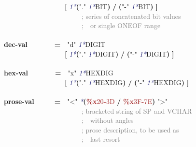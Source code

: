 \documentclass{article}
\begin{document}
{\mbox{~~~~~~~~~~~~~~~~~~}\textbf{[} \textcolor{MidnightBlue}{\emph{1*}}\textbf{(}\textcolor{BrickRed}{"."} \textcolor{MidnightBlue}{\emph{1*}}BIT\textbf{)} \textbf{/} \textbf{(}\textcolor{BrickRed}{"-{}"} \textcolor{MidnightBlue}{\emph{1*}}BIT\textbf{)} \textbf{]}\\
\mbox{~~~~~~~~~~~~~~~~~~~~~~~}\textcolor{Gray}{; series of concatenated bit values}\\
\mbox{~~~~~~~~~~~~~~~~~~~~~~~}\textcolor{Gray}{;\mbox{~~}or single ONEOF range}\\
\\
\textbf{dec-{}val}\mbox{~~~~~~~~}\textbf{=}\mbox{~~}\textcolor{BrickRed}{"d"} \textcolor{MidnightBlue}{\emph{1*}}DIGIT\\
\mbox{~~~~~~~~~~~~~~~~~~}\textbf{[} \textcolor{MidnightBlue}{\emph{1*}}\textbf{(}\textcolor{BrickRed}{"."} \textcolor{MidnightBlue}{\emph{1*}}DIGIT\textbf{)} \textbf{/} \textbf{(}\textcolor{BrickRed}{"-{}"} \textcolor{MidnightBlue}{\emph{1*}}DIGIT\textbf{)} \textbf{]}\\
\\
\textbf{hex-{}val}\mbox{~~~~~~~~}\textbf{=}\mbox{~~}\textcolor{BrickRed}{"x"} \textcolor{MidnightBlue}{\emph{1*}}HEXDIG\\
\mbox{~~~~~~~~~~~~~~~~~~}\textbf{[} \textcolor{MidnightBlue}{\emph{1*}}\textbf{(}\textcolor{BrickRed}{"."} \textcolor{MidnightBlue}{\emph{1*}}HEXDIG\textbf{)} \textbf{/} \textbf{(}\textcolor{BrickRed}{"-{}"} \textcolor{MidnightBlue}{\emph{1*}}HEXDIG\textbf{)} \textbf{]}\\
\\
\textbf{prose-{}val}\mbox{~~~~~~}\textbf{=}\mbox{~~}\textcolor{BrickRed}{"\textless{}"} \textcolor{MidnightBlue}{\emph{*}}\textbf{(}\textcolor{Brown}{\textbf{\%{}x}20\textbf{-}3D} \textbf{/} \textcolor{Brown}{\textbf{\%{}x}3F\textbf{-}7E}\textbf{)} \textcolor{BrickRed}{"\textgreater{}"}\\
\mbox{~~~~~~~~~~~~~~~~~~~~~~~}\textcolor{Gray}{; bracketed string of SP and VCHAR}\\
\mbox{~~~~~~~~~~~~~~~~~~~~~~~}\textcolor{Gray}{;\mbox{~~}without angles}\\
\mbox{~~~~~~~~~~~~~~~~~~~~~~~}\textcolor{Gray}{; prose description, to be used as}\\
\mbox{~~~~~~~~~~~~~~~~~~~~~~~}\textcolor{Gray}{;\mbox{~~}last resort}\\
\\

}
\end{document}
